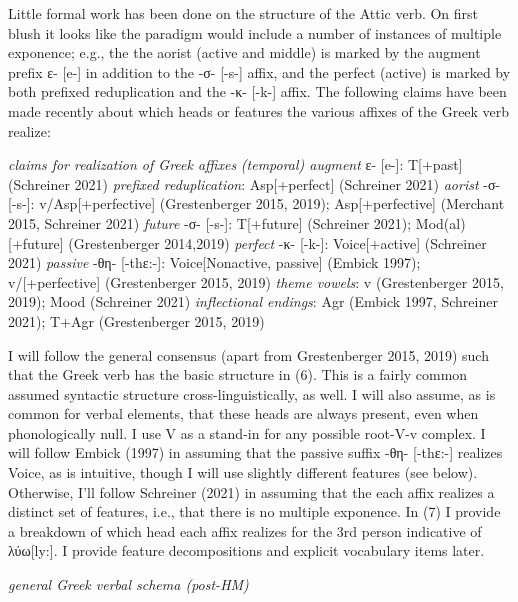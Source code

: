 \documentclass[]{ling-200b-2}
\begin{document}
Little formal work has been done on the structure of the Attic verb. On first blush it looks like the paradigm would include a number of instances of multiple exponence; e.g., the the aorist (active and middle) is marked by the augment prefix ε- [e-] in addition to the -σ- [-s-] affix, and the perfect (active) is marked by both prefixed reduplication and the -κ- [-k-] affix. The following claims have been made recently about which heads or features the various affixes of the Greek verb realize:

\noindent \hfill \par
\pex \textit{claims for realization of Greek affixes}
\a \textit{(temporal) augment} ε- [e-]: T[+past] (Schreiner 2021)
\a \textit{prefixed reduplication}: Asp[+perfect] (Schreiner 2021)
\a \textit{aorist} -σ- [-s-]: v/\underline{\hspace{1em}}Asp[+perfective] (Grestenberger 2015, 2019); Asp[+perfective] (Merchant 2015, Schreiner 2021)
\a \textit{future} -σ- [-s-]: T[+future] (Schreiner 2021); Mod(al)[+future] (Grestenberger 2014,2019)
\a \textit{perfect} -κ- [-k-]: Voice[+active] (Schreiner 2021)
\a \textit{passive} -θη- [-t\super hε:-]: Voice[Nonactive, passive] (Embick 1997); v/\underline{\hspace{1em}}[+perfective] (Grestenberger 2015, 2019)
\a \textit{theme vowels}: v (Grestenberger 2015, 2019); Mood (Schreiner 2021)
\a \textit{inflectional endings}: Agr (Embick 1997, Schreiner 2021); T+Agr (Grestenberger 2015, 2019)
\xe
\noindent \hfill \par

I will follow the general consensus (apart from Grestenberger 2015, 2019) such that the Greek verb has the basic structure in (6). This is a fairly common assumed syntactic structure cross-linguistically, as well. I will also assume, as is common  for verbal elements, that these heads are always present, even when phonologically null. I use V as a stand-in for any possible root-V-v complex. I will follow Embick (1997) in assuming that the passive suffix -θη- [-t\super hε:-] realizes Voice, as is intuitive, though I will use  slightly different features (see below). Otherwise, I'll follow Schreiner (2021) in assuming that the each affix realizes a distinct set of features, i.e., that there is no multiple exponence. In (7) I provide a breakdown of which head each affix realizes for the 3rd person indicative of λύω[ly:]. I provide feature decompositions and explicit vocabulary items later.

\noindent \hfill \par
\ex \textit{general Greek verbal schema (post-HM)}
\end{document}
